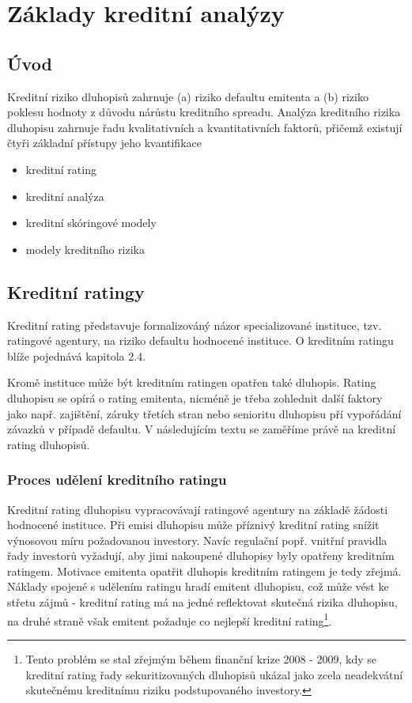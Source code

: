 \documentclass[a4paper]{book}
\begin{document}
\chapter{Základy kreditní analýzy}

\section{Úvod}

Kreditní riziko dluhopisů zahrnuje (a) riziko defaultu emitenta a (b) riziko poklesu hodnoty z důvodu nárůstu kreditního spreadu. Analýza kreditního rizika dluhopisu zahrnuje řadu kvalitativních a kvantitativních faktorů, přičemž existují čtyři základní přístupy jeho kvantifikace
\begin{itemize}
\item kreditní rating
\item kreditní analýza
\item kreditní skóringové modely
\item modely kreditního rizika
\end{itemize}

\section{Kreditní ratingy}

Kreditní rating představuje formalizováný názor specializované instituce, tzv. ratingové agentury, na riziko defaultu hodnocené instituce. O kreditním ratingu blíže pojednává kapitola 2.4.

Kromě instituce může být kreditním ratingen opatřen také dluhopis. Rating dluhopisu se opírá o rating emitenta, nicméně je třeba zohlednit další faktory jako např. zajištění, záruky třetích stran nebo senioritu dluhopisu pří vypořádání závazků v případě defaultu. V následujícím textu se zaměříme právě na kreditní rating dluhopisů.

\subsection{Proces udělení kreditního ratingu}

Kreditní rating dluhopisu vypracovávají ratingové agentury na základě žádosti hodnocené instituce. Při emisi dluhopisu může příznivý kreditní rating snížit výnosovou míru požadovanou investory. Navíc regulační popř. vnitřní pravidla řady investorů vyžadují, aby jimi nakoupené dluhopisy byly opatřeny kreditním ratingem. Motivace emitenta opatřit dluhopis kreditním ratingem je tedy zřejmá. Náklady spojené s udělením ratingu hradí emitent dluhopisu, což může vést ke střetu zájmů - kreditní rating má na jedné reflektovat skutečná rizika dluhopisu, na druhé straně však emitent požaduje co nejlepší kreditní rating\footnote{Tento problém se stal zřejmým během finanční krize 2008 - 2009, kdy se kreditní rating řady sekuritizovaných dluhopisů ukázal jako zcela neadekvátní skutečnému kreditnímu riziku podstupovaného investory.}.
\end{document}
